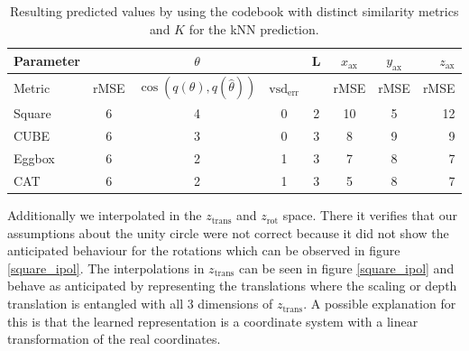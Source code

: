 \documentclass[10pt,a4paper]{article}
\newcommand{\rot}{\ensuremath{\text{rot}\xspace}}
\newcommand{\trans}{\ensuremath{\text{trans}\xspace}}
\begin{document}
\begin{table}
\begin{tabular}[width = \textwidth]{l*{6}{c}r} 
Parameter              &  & $\theta$ &  & L & $x_{\text{ax}}$  & $y_{\text{ax}}$ & $z_{\text{ax}}$ \\
\hline
Metric &  rMSE& $\cos(q(\theta), q(\hat{\theta}))$ & $\text{vsd}_{\text{err}}$ &  & rMSE  & rMSE & rMSE \\
\hline
Square & 6 & 4 & 0 & 2 & 10 & 5 & 12  \\
CUBE            & 6 & 3 & 0 & 3 &  8 & 9 &  9  \\
Eggbox           & 6 & 2 & 1 & 3 &  7 & 8 &  7  \\
CAT     & 6 & 2 & 1 & 3 &  5 & 8 &  7  \\
\end{tabular}
\caption{Resulting predicted values by using the codebook with distinct similarity metrics and $K$ for the kNN prediction.}
\label{square_results}
\end{table}
Additionally we interpolated in the $z_{\trans}$ and $z_{\rot}$ space. There it verifies that our assumptions about the unity circle were not correct because it did not show the anticipated behaviour for the rotations which can be observed in figure \ref{square_ipol}.
The interpolations in $z_{\trans}$ can be seen in figure \ref{square_ipol} and behave as anticipated by representing the translations where the scaling or depth translation is entangled with all 3 dimensions of $z_{\trans}$. A possible explanation for this is that the learned representation is a coordinate system with a linear transformation of the real coordinates.\\  
\end{document}
